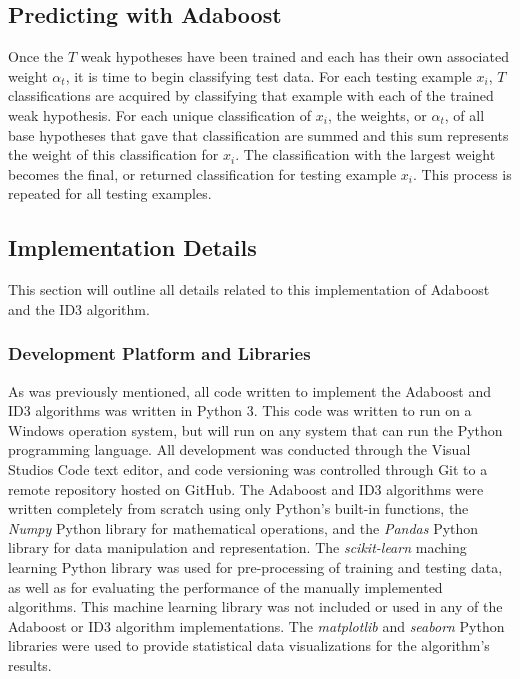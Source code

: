 \documentclass[a4paper]{article}
\begin{document}
\subsection{Predicting with Adaboost}
Once the $T$ weak hypotheses have been trained and each has their own associated weight $\alpha_t$, it is time to begin classifying test data. For each testing example $x_i$, $T$ classifications are acquired by classifying that example with each of the trained weak hypothesis. For each unique classification of $x_i$, the weights, or $\alpha_t$, of all base hypotheses that gave that classification are summed and this sum represents the weight of this classification for $x_i$. The classification with the largest weight becomes the final, or returned classification for testing example $x_i$. This process is repeated for all testing examples.

\subsection{Implementation Details}
This section will outline all details related to this implementation of Adaboost and the ID3 algorithm.

\subsubsection{Development Platform and Libraries}
As was previously mentioned, all code written to implement the Adaboost and ID3 algorithms was written in Python 3. This code was written to run on a Windows operation system, but will run on any system that can run the Python programming language. All development was conducted through the Visual Studios Code text editor, and code versioning was controlled through Git to a remote repository hosted on GitHub. The Adaboost and ID3 algorithms were written completely from scratch using only Python's built-in functions, the \textit{Numpy} Python library for mathematical operations, and the \textit{Pandas} Python library for data manipulation and representation. The \textit{scikit-learn} maching learning Python library was used for pre-processing of training and testing data, as well as for evaluating the performance of the manually implemented algorithms. This machine learning library was not included or used in any of the Adaboost or ID3 algorithm implementations. The \textit{matplotlib} and \textit{seaborn} Python libraries were used to provide statistical data visualizations for the algorithm's results.
\end{document}
